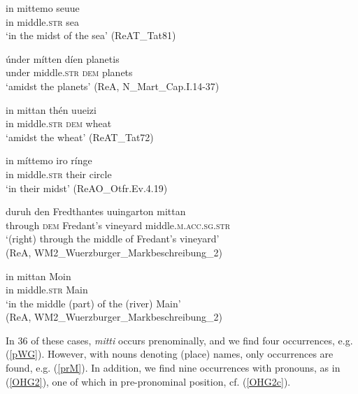 \documentclass[output=paper,colorlinks,citecolor=brown]{langscibook}
\begin{document}
\begin{exe}
   \ex \label{OHG1}   
    \begin{xlist}
       \ex \gll in mittemo seuue  \\ 
        in middle.\textsc{str} sea  \\ 
        \glt `in the midst of the sea' (ReAT\_Tat81) 
         
        \ex \gll únder mítten díen planetis   \\ 
           under middle.\textsc{str} \textsc{dem} planets \\
        \glt `amidst the planets' (ReA, N\_Mart\_Cap.I.14-37) 

        \ex \gll in mittan thén uueizi   \\ 
         in middle.\textsc{str} \textsc{dem} wheat  \\ 
          \glt `amidst the wheat' (ReAT\_Tat72)   

       \ex \gll in míttemo iro rínge \\ 
         in middle.\textsc{str} their circle   \\ 
       \glt  `in their midst' (ReAO\_Otfr.Ev.4.19)

       \ex \label{pWG} \gll duruh den Fredthantes uuingarton mittan \\  
          through \textsc{dem} Fredant's vineyard  middle.\textsc{m.acc.sg.str}  \\
        \glt `(right) through the middle of Fredant's vineyard' \\ 
           \glt (ReA, WM2\_Wuerzburger\_Markbeschreibung\_2)

       \ex \label{prM} \gll  in mittan  Moin    \\  
         in  middle.\textsc{str} Main  \\ 
        \glt `in the middle (part) of the (river) Main' \\ 
          \glt (ReA, WM2\_Wuerzburger\_Markbeschreibung\_2)

    \end{xlist}
\end{exe} 

In 36 of these cases, \textit{mitti} occurs prenominally,  and we find four  occurrences, e.g. (\ref{pWG}). However,  with nouns denoting (place) names, only  occurrences are found, e.g. (\ref{prM}).  In addition, we find nine occurrences with pronouns, as in (\ref{OHG2}), one of which in pre-pronominal position, cf. (\ref{OHG2c}).
\end{document}

